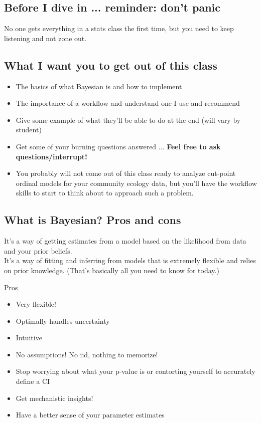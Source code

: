 \documentclass[11pt]{article}
\begin{document}
\subsection{Before I dive in ... reminder: don't panic} %
No one gets everything in a stats class the first time, but you need to keep listening and not zone out.

\subsection{What I want you to get out of this class} 
\begin{itemize}
\item The basics of what Bayesian is and how to implement
\item The importance of a workflow and understand one I use and recommend
\item Give some example of what they'll be able to do at the end (will vary by student)
\item Get some of your burning questions answered ... {\bf Feel free to ask questions/interrupt!}
\item You probably will not come out of this class ready to analyze cut-point ordinal models for your community ecology data, but you'll have the workflow skills to start to think about to approach such a problem. 
\end{itemize}

\subsection{What is Bayesian? Pros and cons}
It's a way of getting estimates from a model based on the likelihood from data and your prior beliefs.\\
It's a way of fitting and inferring from models that is extremely flexible and relies on prior knowledge. (That's basically all you need to know for today.)\\


Pros
\begin{itemize}
\item Very flexible!
\item Optimally handles uncertainty
\item Intuitive
\item No assumptions! No iid, nothing to memorize!
\item Stop worrying about what your p-value is or contorting yourself to accurately define a CI
\item Get mechanistic insights!
\item Have a better sense of your parameter estimates
\end{itemize}
\end{document}
